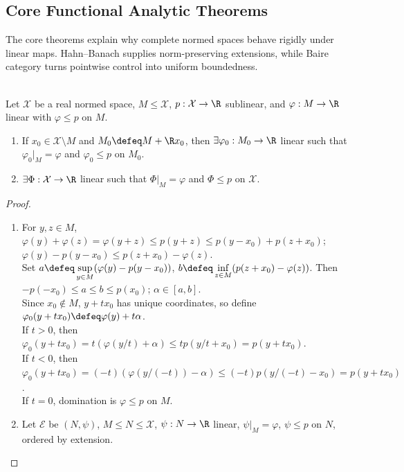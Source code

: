\subsection{Core Functional Analytic Theorems}

%

The core theorems explain why complete normed spaces behave rigidly under linear maps. Hahn--Banach supplies norm-preserving extensions, while Baire category turns pointwise control into uniform boundedness.

\begin{theorem} \label{thm:hahn-banach-extension} \\
Let $\mathcal{X}$ be a real normed space, $M\leq\mathcal{X}$, $p:\mathcal{X}\to\R$ sublinear, and $\varphi:M\to\R$ linear with $\varphi\leq p$ on $M$.
\begin{enumerate}[label=(\roman*)]
\setlength{\itemsep}{0pt}
\item If $x_0\in\mathcal X\setminus M$ and $M_0\defeq M+\R x_0$, then $\exists\varphi_0:M_0\to\R$ linear such that $\varphi_0|_M=\varphi$ and $\varphi_0\leq p$ on $M_0$.
\item $\exists\Phi:\mathcal{X}\to\R$ linear such that $\Phi|_M=\varphi$ and $\Phi\leq p$ on $\mathcal X$.
\end{enumerate}
\begin{proof}
\begin{enumerate}[label=(\roman*)]
\setlength{\itemsep}{0pt}
\item For $y,z\in M$, $\varphi(y)+\varphi(z)=\varphi(y+z)\leq p(y+z)\leq p(y-x_0)+p(z+x_0)$; $\varphi(y)-p(y-x_0)\leq p(z+x_0)-\varphi(z)$.\\
Set $a\defeq\sup\limits_{y\in M}(\varphi(y)-p(y-x_0))$, $b\defeq\inf\limits_{z\in M}(p(z+x_0)-\varphi(z))$. Then $-p(-x_0)\leq a\leq b\leq p(x_0)$; $\alpha\in[a,b]$.\\
Since $x_0\notin M$, $y+tx_0$ has unique coordinates, so define $\varphi_0(y+tx_0)\defeq\varphi(y)+t\alpha$.\\
If $t>0$, then $\varphi_0(y+tx_0)=t(\varphi(y/t)+\alpha)\leq tp(y/t+x_0)=p(y+tx_0)$.\\
If $t<0$, then $\varphi_0(y+tx_0)=(-t)(\varphi(y/(-t))-\alpha)\leq(-t)p(y/(-t)-x_0)=p(y+tx_0)$.\\
If $t=0$, domination is $\varphi\leq p$ on $M$.
\item Let $\mathscr E$ be $(N,\psi)$, $M\leq N\leq\mathcal X$, $\psi:N\to\R$ linear, $\psi|_M=\varphi$, $\psi\leq p$ on $N$, ordered by extension.\\

\end{enumerate}
\end{proof}
\end{theorem}
